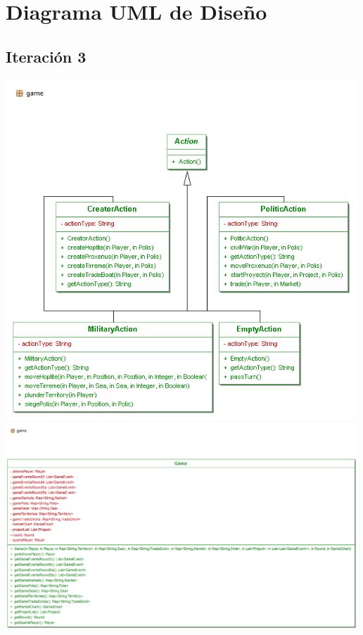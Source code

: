\documentclass[11 pt]{book}
\begin{document}
\chapter{Diagrama UML de Diseño}
	\section*{Iteración 3}
		\begin{center}
		    \includegraphics[width=500px]{design-uml/iteration3/game-actions.png}
		    \includegraphics[width=500px]{design-uml/iteration3/game-game.png}

\end{center}
\end{document}
